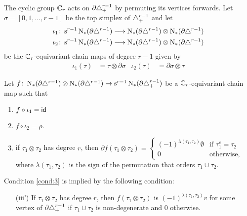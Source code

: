 The cyclic group $\mathbb{C}_r$ acts on $\partial \triangle_{+}^{r-1}$ by permuting its vertices forwards. Let $\sigma = [0,1,\ldots,r-1]$ be the top simplex of $\triangle_{+}^{r-1}$ and let
\begin{align*}
	\iota_1\colon \operatorname{s}^{r-1}\operatorname{N}_{*}(\partial \triangle^{r-1})&\longrightarrow \operatorname{N}_{*}(\partial\triangle^{r-1})\otimes \operatorname{N}_{*}(\partial\triangle^{r-1})\\
	\iota_2\colon \operatorname{s}^{r-1}\operatorname{N}_{*}(\partial \triangle^{r-1})&\longrightarrow \operatorname{N}_{*}(\partial\triangle^{r-1})\otimes \operatorname{N}_{*}(\partial\triangle^{r-1})
\end{align*}
be the $\mathbb{C}_r$-equivariant chain maps of degree $r-1$ given by
\begin{align*}
	\iota_1(\tau) &= \tau\otimes \partial \sigma &
	\iota_2(\tau) &= \partial \sigma\otimes \tau
\end{align*}
\begin{construction}\label{cons:1} Let $f\colon \operatorname{N}_{*}(\partial\triangle^{r-1})\otimes\operatorname{N}_{*}(\partial\triangle^{r-1})\to \operatorname{s}^{r-1}\operatorname{N}_{*}(\partial\triangle_{+}^{r-1})$ be a $\mathbb{C}_r$-equivariant chain map such that
\renewcommand{\theenumi}{\roman{enumi}}
\begin{enumerate}
	\item\label{cond:1} $f\circ \iota_1 = \mathsf{id}$
	\item\label{cond:2} $f\circ \iota_2 = \rho$.
	\item\label{cond:3} if $\tau_1\otimes\tau_2$ has degree $r$, then $ \partial f(\tau_1\otimes\tau_2) =
	\begin{cases}
		(-1)^{\lambda(\tau_1,\tau_2)}\emptyset & \text{if $\tau_1^c=\tau_2$} \\
		0 & \text{otherwise},
	\end{cases}$
	where $\lambda(\tau_1,\tau_2)$ is the sign of the permutation that orders $\tau_1\cup \tau_2$.
\end{enumerate}
\end{construction}
\begin{remark}\label{remark:3prime}
	Condition \eqref{cond:3} is implied by the following condition:
	\begin{itemize}
		\item[(iii')] If $\tau_1\otimes\tau_2$ has degree $r$, then $f(\tau_1\otimes \tau_2)$ is $(-1)^{\lambda(\tau_1,\tau_2)} v$ for some vertex of $\partial \triangle_{+}^{r-1}$ if $\tau_1\cup\tau_2$ is non-degenerate and $0$ otherwise.
	\end{itemize}
\end{remark}

